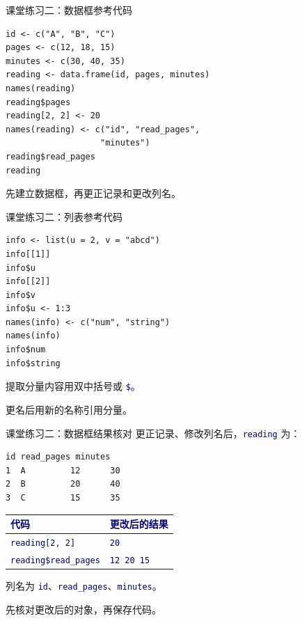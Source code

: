 \documentclass[14pt,compress,t,noamsthm,notheorem,table,handout,fontset=none]{ctexbeamer}
\newcommand{\code}[1]{\textcolor{navy}{\texttt{#1}}}
\newcommand{\thead}[1]{\textcolor{navy}{\textbf{#1}}}
\begin{document}
\begin{frame}[fragile]{课堂练习二：数据框参考代码}
\begin{lstlisting}
id <- c("A", "B", "C")
pages <- c(12, 18, 15)
minutes <- c(30, 40, 35)
reading <- data.frame(id, pages, minutes)
names(reading)
reading$pages
reading[2, 2] <- 20
names(reading) <- c("id", "read_pages",
                   "minutes")
reading$read_pages
reading
\end{lstlisting}
  \vfill
  先建立数据框，再更正记录和更改列名。
\end{frame}

\begin{frame}[fragile]{课堂练习二：列表参考代码}
\begin{lstlisting}
info <- list(u = 2, v = "abcd")
info[[1]]
info$u
info[[2]]
info$v
info$u <- 1:3
names(info) <- c("num", "string")
names(info)
info$num
info$string
\end{lstlisting}
  \vfill
  提取分量内容用双中括号或 \code{\$}。\par
  更名后用新的名称引用分量。
\end{frame}

\begin{frame}[fragile]{课堂练习二：数据框结果核对}
  \small
  更正记录、修改列名后，\code{reading} 为：
\begin{lstlisting}[style=output]
  id read_pages minutes
1  A         12      30
2  B         20      40
3  C         15      35
\end{lstlisting}
  \renewcommand{\arraystretch}{1.4}
  \begin{tabular*}{\linewidth}{@{\extracolsep{\fill}}ll@{}}
    \toprule
    \thead{代码} & \thead{更改后的结果} \\
    \midrule
    \code{reading[2, 2]} & \code{20} \\
    \code{reading\$read\_pages} & \code{12 20 15} \\
    \bottomrule
  \end{tabular*}\par
  \vspace{0.6em}
  列名为 \code{id}、\code{read\_pages}、\code{minutes}。\par
  先核对更改后的对象，再保存代码。
\end{frame}
\end{document}
